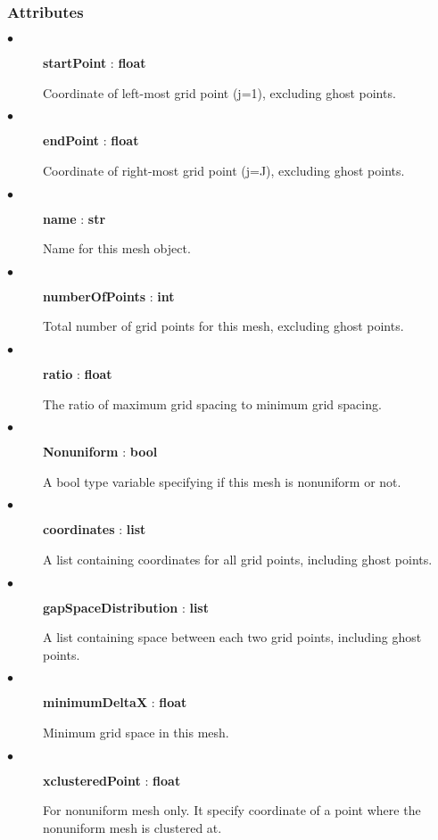 \documentclass[11pt]{article}
\begin{document}
        \subsubsection{Attributes}
        \begin{description}
            \item[$\bullet$] \textbf{startPoint} : \textbf{float}
                \par
		Coordinate of left-most grid point (j=1), excluding ghost points.
            \item[$\bullet$] \textbf{endPoint} : \textbf{float}
                \par
		Coordinate of right-most grid point (j=J), excluding ghost points.
            \item[$\bullet$] \textbf{name} : \textbf{str}
                \par
		Name for this mesh object.
            \item[$\bullet$] \textbf{numberOfPoints} : \textbf{int}
                \par
		Total number of grid points for this mesh, excluding ghost points. 
            \item[$\bullet$] \textbf{ratio} : \textbf{float}
                \par
		The ratio of maximum grid spacing to minimum grid spacing.
            \item[$\bullet$] \textbf{Nonuniform} : \textbf{bool}
                \par
		A bool type variable specifying if this mesh is nonuniform or not.
            \item[$\bullet$] \textbf{coordinates} : \textbf{list}
                \par
		A list containing coordinates for all grid points, including ghost points.
            \item[$\bullet$] \textbf{gapSpaceDistribution} : \textbf{list}
                \par
		A list containing space between each two grid points, including ghost points.
            \item[$\bullet$] \textbf{minimumDeltaX} : \textbf{float}
                \par
		Minimum grid space in this mesh.
            \item[$\bullet$] \textbf{xclusteredPoint} : \textbf{float}
                \par
		For nonuniform mesh only. It specify coordinate of a point where the nonuniform mesh is clustered at.
	\end{description}
\end{document}
